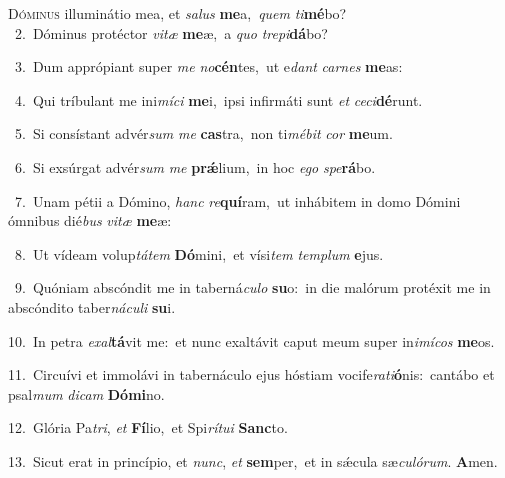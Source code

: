 \lettrine{\initial\textcolor{\initialcolor}{D}}{óminus} illuminátio mea, et \textit{sa}\-\textit{lus} \textbf{me}\-a,~\star \textit{quem} \textit{ti}\-\textbf{mé}bo?\\
{\numbfont\textcolor{\numbcolor}{~2.}}~Dóminus protéctor \textit{vi}\-\textit{tæ} \textbf{me}\-æ,~\star a \textit{quo} \textit{tre}\-\textit{pi}\textbf{dá}bo?\par
{\numbfont\textcolor{\numbcolor}{~3.}}~Dum apprópiant super \textit{me} \textit{no}\-\textbf{cén}tes,~\star ut e\textit{dant} \textit{car}\-\textit{nes} \textbf{me}\-as:\par
{\numbfont\textcolor{\numbcolor}{~4.}}~Qui tríbulant me ini\-\textit{mí}\-\textit{ci} \textbf{me}\-i,~\star ipsi infirmáti sunt \textit{et} \textit{ce}\-\textit{ci}\textbf{dé}runt.\par
{\numbfont\textcolor{\numbcolor}{~5.}}~Si consístant advér\textit{sum} \textit{me} \textbf{cas}\-tra,~\star non ti\-\textit{mé}\-\textit{bit} \textit{cor} \textbf{me}\-um.\par
{\numbfont\textcolor{\numbcolor}{~6.}}~Si exsúrgat advér\textit{sum} \textit{me} \textbf{prǽ}\-lium,~\star in hoc \textit{e}\-\textit{go} \textit{spe}\-\textbf{rá}bo.\par
{\numbfont\textcolor{\numbcolor}{~7.}}~Unam pétii a Dómino, \textit{hanc} \textit{re}\-\textbf{quí}ram,~\star ut inhábitem in domo Dómini ómnibus dié\textit{bus} \textit{vi}\-\textit{tæ} \textbf{me}\-æ:\par
{\numbfont\textcolor{\numbcolor}{~8.}}~Ut vídeam volup\-\textit{tá}\-\textit{tem} \textbf{Dó}\-mini,~\star et vísi\textit{tem} \textit{tem}\-\textit{plum} \textbf{e}\-jus.\par
{\numbfont\textcolor{\numbcolor}{~9.}}~Quóniam abscóndit me in taberná\-\textit{cu}\-\textit{lo} \textbf{su}\-o:~\star in die malórum protéxit me in abscóndito taber\-\textit{ná}\-\textit{cu}\textit{li} \textbf{su}\-i.\par
{\numbfont\textcolor{\numbcolor}{10.}}~In petra \textit{ex}\-\textit{al}\textbf{tá}vit me:~\star et nunc exaltávit caput meum super in\-\textit{i}\-\textit{mí}\textit{cos} \textbf{me}\-os.\par
{\numbfont\textcolor{\numbcolor}{11.}}~Circuívi et immolávi in tabernáculo ejus hóstiam vocife\-\textit{ra}\-\textit{ti}\textbf{ó}nis:~\star cantábo et psal\textit{mum} \textit{di}\-\textit{cam} \textbf{Dó}\-\textbf{mi}no.\par
{\numbfont\textcolor{\numbcolor}{12.}}~Glória Pa\-\textit{tri}\-, \textit{et} \textbf{Fí}\-lio,~\star et Spi\-\textit{rí}\-\textit{tu}\textit{i} \textbf{Sanc}\-to.\par
{\numbfont\textcolor{\numbcolor}{13.}}~Sicut erat in princípio, et \textit{nunc}\-, \textit{et} \textbf{sem}\-per,~\star et in sǽcula sæ\-\textit{cu}\-\textit{ló}\textit{rum}. \textbf{A}\-men.\par
